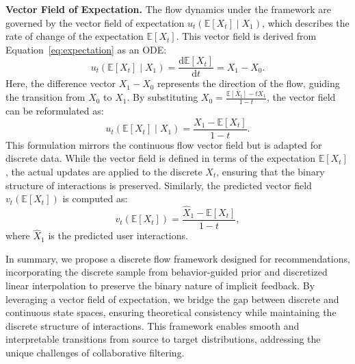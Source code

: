 \documentclass[sigconf]{acmart}
\begin{document}
\vspace{3pt}
\noindent \textbf{Vector Field of Expectation.}
The flow dynamics under the framework are governed by the vector field of expectation  $u_t(\mathbb E[X_t] \mid X_1)$, which describes the rate of change of the expectation $\mathbb E[X_t]$. This vector field is derived from Equation~\ref{eq:expectation} as an ODE:
\begin{equation}
    \label{eq:vector_field1}
    u_t(\mathbb E[X_t] \mid X_1) = \frac{\mathrm d \mathbb E[X_t]}{\mathrm d t} = X_1 - X_0.
\end{equation}
Here, the difference vector $X_1 - X_0$ represents the direction of the flow, guiding the transition from $X_0$ to $X_1$.
By substituting $X_0 = \frac{\mathbb E[X_t] - t X_1}{1 - t}$, the vector field can be reformulated as:
\begin{equation}
    \label{eq:vector_field2}
    u_t(\mathbb E[X_t] \mid X_1) = \frac{X_1 - \mathbb E[X_t]}{1 - t}.
\end{equation}
This formulation mirrors the continuous flow vector field but is adapted for discrete data. While the vector field is defined in terms of the expectation $\mathbb E[X_t]$, the actual updates are applied to the discrete $X_t$, ensuring that the binary structure of interactions is preserved.
Similarly, the predicted vector field $v_t(\mathbb E[X_t])$ is computed as:
\begin{equation}
    v_t(\mathbb E[X_t]) = \frac{\hat X_1 - \mathbb E[X_t]}{1 - t},
\end{equation}
where $\hat X_1$ is the predicted user interactions.

In summary, we propose a discrete flow framework designed for recommendations, incorporating the discrete sample from behavior-guided prior and discretized linear interpolation to preserve the binary nature of implicit feedback. By leveraging a vector field of expectation, we bridge the gap between discrete and continuous state spaces, ensuring theoretical consistency while maintaining the discrete structure of interactions. This framework enables smooth and interpretable transitions from source to target distributions, addressing the unique challenges of collaborative filtering.
\end{document}
